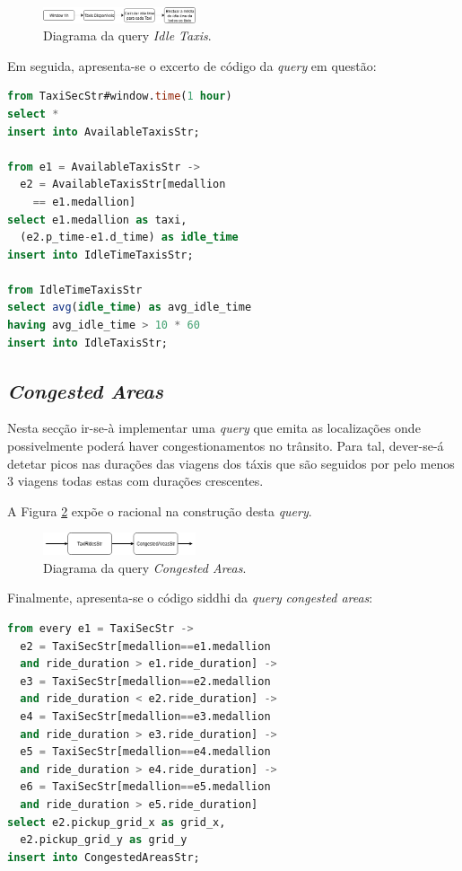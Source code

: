 \documentclass[article]{IEEEtran}
\begin{document}
\begin{figure}[hbtp]
    \centering
        \includegraphics[width=0.4\textwidth]{images/idleTaxisDiagram}
    \caption{Diagrama da query \textit{Idle Taxis}.}
    \label{fig:idleTaxisDiagram}
\end{figure}

Em seguida, apresenta-se o excerto de código da \textit{query} em questão:
\begin{lstlisting}[language=SQL]
from TaxiSecStr#window.time(1 hour)
select *
insert into AvailableTaxisStr;

from e1 = AvailableTaxisStr -> 
  e2 = AvailableTaxisStr[medallion
    == e1.medallion]
select e1.medallion as taxi,
  (e2.p_time-e1.d_time) as idle_time
insert into IdleTimeTaxisStr;

from IdleTimeTaxisStr
select avg(idle_time) as avg_idle_time
having avg_idle_time > 10 * 60
insert into IdleTaxisStr;
\end{lstlisting}


\subsection{\textit{Congested Areas}}

Nesta secção ir-se-à implementar uma \textit{query} que emita as localizações onde possivelmente poderá haver congestionamentos no trânsito. Para tal, dever-se-á detetar picos nas durações das viagens dos táxis que são seguidos por pelo menos 3 viagens todas estas com durações crescentes.

A Figura \ref{fig:congestedAreasDiagram} expõe o racional na construção desta \textit{query}.

\begin{figure}[hbtp]
    \centering
        \includegraphics[width=0.4\textwidth]{images/congestedAreas}
    \caption{Diagrama da query \textit{Congested Areas}.}
    \label{fig:congestedAreasDiagram}
\end{figure}

Finalmente, apresenta-se o código siddhi da \textit{query} \textit{congested areas}:

\begin{lstlisting}[language=SQL]
from every e1 = TaxiSecStr ->
  e2 = TaxiSecStr[medallion==e1.medallion
  and ride_duration > e1.ride_duration] ->
  e3 = TaxiSecStr[medallion==e2.medallion
  and ride_duration < e2.ride_duration] ->
  e4 = TaxiSecStr[medallion==e3.medallion
  and ride_duration > e3.ride_duration] ->
  e5 = TaxiSecStr[medallion==e4.medallion
  and ride_duration > e4.ride_duration] ->
  e6 = TaxiSecStr[medallion==e5.medallion
  and ride_duration > e5.ride_duration]
select e2.pickup_grid_x as grid_x,
  e2.pickup_grid_y as grid_y
insert into CongestedAreasStr;
\end{lstlisting}
\end{document}

